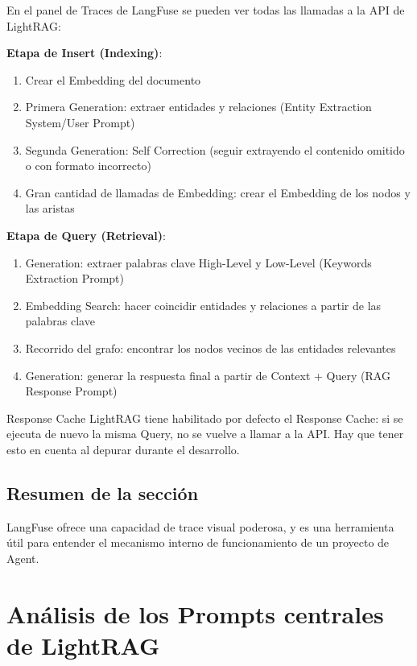 \documentclass[a4paper]{article}
\begin{document}
En el panel de Traces de LangFuse se pueden ver todas las llamadas a la API de LightRAG:

\textbf{Etapa de Insert (Indexing)}:
\begin{enumerate}
    \item Crear el Embedding del documento
    \item Primera Generation: extraer entidades y relaciones (Entity Extraction System/User Prompt)
    \item Segunda Generation: Self Correction (seguir extrayendo el contenido omitido o con formato incorrecto)
    \item Gran cantidad de llamadas de Embedding: crear el Embedding de los nodos y las aristas
\end{enumerate}

\textbf{Etapa de Query (Retrieval)}:
\begin{enumerate}
    \item Generation: extraer palabras clave High-Level y Low-Level (Keywords Extraction Prompt)
    \item Embedding Search: hacer coincidir entidades y relaciones a partir de las palabras clave
    \item Recorrido del grafo: encontrar los nodos vecinos de las entidades relevantes
    \item Generation: generar la respuesta final a partir de Context + Query (RAG Response Prompt)
\end{enumerate}

\begin{warningbox}{Response Cache}
LightRAG tiene habilitado por defecto el Response Cache: si se ejecuta de nuevo la misma Query, no se vuelve a llamar a la API. Hay que tener esto en cuenta al depurar durante el desarrollo.
\end{warningbox}

\subsection{Resumen de la sección}

LangFuse ofrece una capacidad de trace visual poderosa, y es una herramienta útil para entender el mecanismo interno de funcionamiento de un proyecto de Agent.

\section{Análisis de los Prompts centrales de LightRAG}
\end{document}
